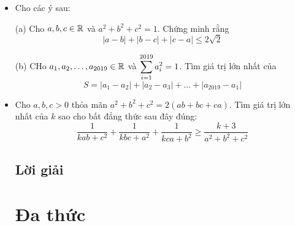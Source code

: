 \documentclass[11pt]{scrartcl}
\begin{document}
\begin{itemize}[label=, leftmargin=0em, itemsep=0.5em]
\begin{btvn}
        \end{btvn}
        \item \begin{btvn} Cho các ý sau:
        
            (a) Cho $a,b,c \in \mathbb{R}$ và $a^2 + b^2 + c^2 = 1$. Chứng minh rằng
            \[
                |a - b| + |b - c| + |c - a| \leq 2\sqrt{2}
            \]
    
            (b) CHo $a_1, a_2,\dots,a_{2019} \in \mathbb{R}$ và $\displaystyle\sum_{i = 1}^{2019}a_i^2 = 1$. Tìm giá trị lớn nhất của 
            \[
                S = |a_1 - a_2| + |a_2 - a_3| + \dots + |a_{2019} - a_1|
            \]
            \end{btvn}
        \item \begin{btvn}
            Cho $a,b,c > 0$ thỏa mãn $a^2 + b^2 + c^2 = 2(ab + bc + ca)$. Tìm giá trị lớn nhất của $k$ sao cho bất đẳng thức sau đây đúng:
            \[
                \frac{1}{kab + c^2} + \frac{1}{kbc + a^2} + \frac{1}{kca + b^2} \geq \frac{k + 3}{a^2 + b^2 + c^2}
            \]
        \end{btvn}
        \subsection{\LARGE \textcolor{dk}{Lời giải}}
        
        \newpage
        \thispagestyle{plain}
        
        \section{\huge Đa thức}

\end{itemize}
\end{document}
